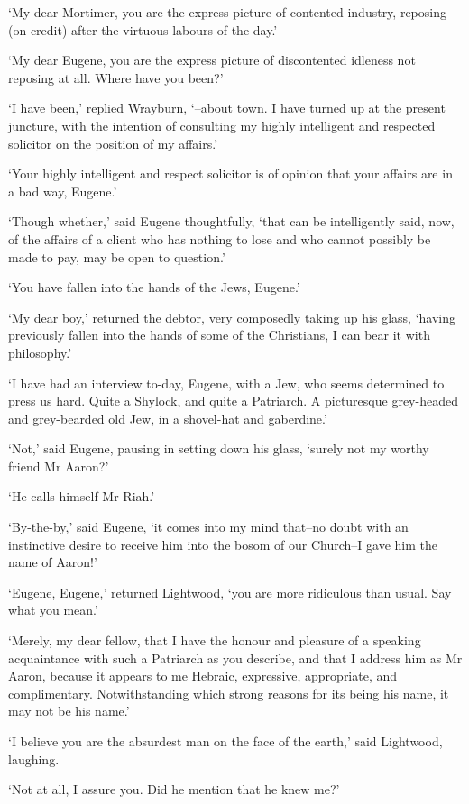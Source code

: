 ‘My dear Mortimer, you are the express picture of contented industry,
reposing (on credit) after the virtuous labours of the day.’

‘My dear Eugene, you are the express picture of discontented idleness
not reposing at all. Where have you been?’

‘I have been,’ replied Wrayburn, ‘--about town. I have turned up at the
present juncture, with the intention of consulting my highly intelligent
and respected solicitor on the position of my affairs.’

‘Your highly intelligent and respect solicitor is of opinion that your
affairs are in a bad way, Eugene.’

‘Though whether,’ said Eugene thoughtfully, ‘that can be intelligently
said, now, of the affairs of a client who has nothing to lose and who
cannot possibly be made to pay, may be open to question.’

‘You have fallen into the hands of the Jews, Eugene.’

‘My dear boy,’ returned the debtor, very composedly taking up his glass,
‘having previously fallen into the hands of some of the Christians, I
can bear it with philosophy.’

‘I have had an interview to-day, Eugene, with a Jew, who seems
determined to press us hard. Quite a Shylock, and quite a Patriarch. A
picturesque grey-headed and grey-bearded old Jew, in a shovel-hat and
gaberdine.’

‘Not,’ said Eugene, pausing in setting down his glass, ‘surely not my
worthy friend Mr Aaron?’

‘He calls himself Mr Riah.’

‘By-the-by,’ said Eugene, ‘it comes into my mind that--no doubt with an
instinctive desire to receive him into the bosom of our Church--I gave
him the name of Aaron!’

‘Eugene, Eugene,’ returned Lightwood, ‘you are more ridiculous than
usual. Say what you mean.’

‘Merely, my dear fellow, that I have the honour and pleasure of a
speaking acquaintance with such a Patriarch as you describe, and that I
address him as Mr Aaron, because it appears to me Hebraic, expressive,
appropriate, and complimentary. Notwithstanding which strong reasons for
its being his name, it may not be his name.’

‘I believe you are the absurdest man on the face of the earth,’ said
Lightwood, laughing.

‘Not at all, I assure you. Did he mention that he knew me?’

